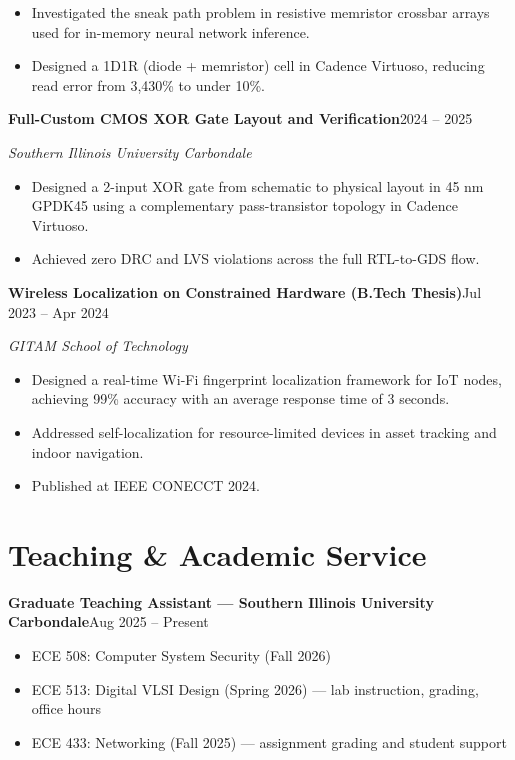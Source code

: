 \documentclass[10.5pt,letterpaper]{article}
\newcommand{\entry}[2]{\textbf{#1}\hfill #2\par}
\newcommand{\subentry}[2]{\textit{#1}\hfill \textit{#2}\par\vspace{0.15em}}
\begin{document}
\begin{itemize}
  \item Investigated the sneak path problem in resistive memristor crossbar arrays used for in-memory
        neural network inference.
  \item Designed a 1D1R (diode + memristor) cell in Cadence Virtuoso, reducing read error from 3,430\%
        to under 10\%.
\end{itemize}
\vspace{0.35em}
\entry{Full-Custom CMOS XOR Gate Layout and Verification}{2024 -- 2025}
\subentry{Southern Illinois University Carbondale}{}
\begin{itemize}
  \item Designed a 2-input XOR gate from schematic to physical layout in 45 nm GPDK45 using a
        complementary pass-transistor topology in Cadence Virtuoso.
  \item Achieved zero DRC and LVS violations across the full RTL-to-GDS flow.
\end{itemize}
\vspace{0.35em}
\entry{Wireless Localization on Constrained Hardware (B.Tech Thesis)}{Jul 2023 -- Apr 2024}
\subentry{GITAM School of Technology}{}
\begin{itemize}
  \item Designed a real-time Wi-Fi fingerprint localization framework for IoT nodes, achieving 99\%
        accuracy with an average response time of 3 seconds.
  \item Addressed self-localization for resource-limited devices in asset tracking and indoor
        navigation.
  \item Published at IEEE CONECCT 2024.
\end{itemize}

\section*{Teaching \& Academic Service}
\entry{Graduate Teaching Assistant --- Southern Illinois University Carbondale}{Aug 2025 -- Present}
\begin{itemize}
  \item ECE 508: Computer System Security (Fall 2026)
  \item ECE 513: Digital VLSI Design (Spring 2026) --- lab instruction, grading, office hours
  \item ECE 433: Networking (Fall 2025) --- assignment grading and student support
\end{itemize}
\end{document}
